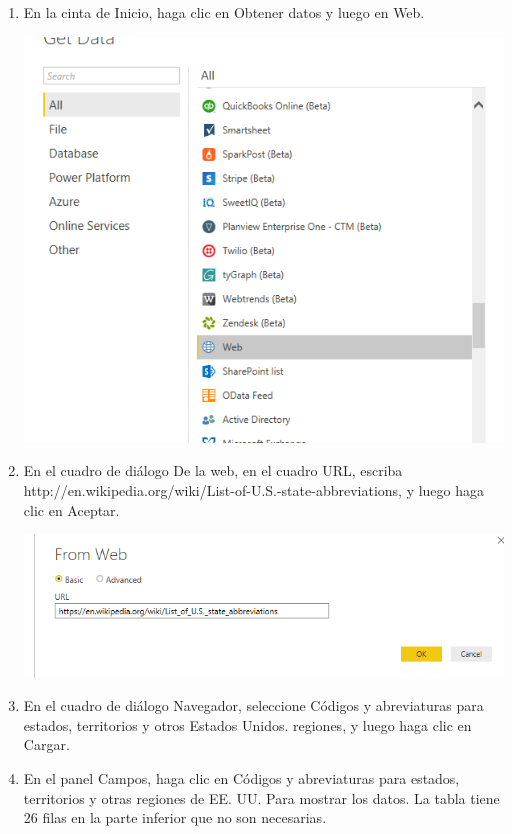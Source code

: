 \documentclass[12pt,letterpaper]{article}
\begin{document}
\begin{enumerate}
    
    \item En la cinta de Inicio, haga clic en Obtener datos y luego en Web.

    \begin{center}
	\includegraphics[width=13cm]{./Imagenes/7}
	\end{center}

    \item En el cuadro de diálogo De la web, en el cuadro URL, escriba http://en.wikipedia.org/wiki/List-of-U.S.-state-abbreviations, y luego haga clic en Aceptar.
    
         \begin{center}
	\includegraphics[width=13cm]{./Imagenes/8}
	\end{center}
    
    \item En el cuadro de diálogo Navegador, seleccione Códigos y abreviaturas para estados, territorios y otros Estados Unidos. regiones, y luego haga clic en Cargar.
    
    
     \item En el panel Campos, haga clic en Códigos y abreviaturas para estados, territorios y otras regiones de EE. UU. Para mostrar los datos. La tabla tiene 26 filas en la parte inferior que no son necesarias.
    

\end{enumerate}
\end{document}

